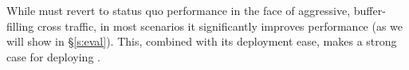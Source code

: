 \vspace{0.05in}
 While \name must revert to status quo performance in the face of aggressive, buffer-filling cross traffic, in most scenarios it significantly improves performance (as we will show in \S\ref{s:eval}).
This, combined with its deployment ease, makes a strong case for deploying \name. 
